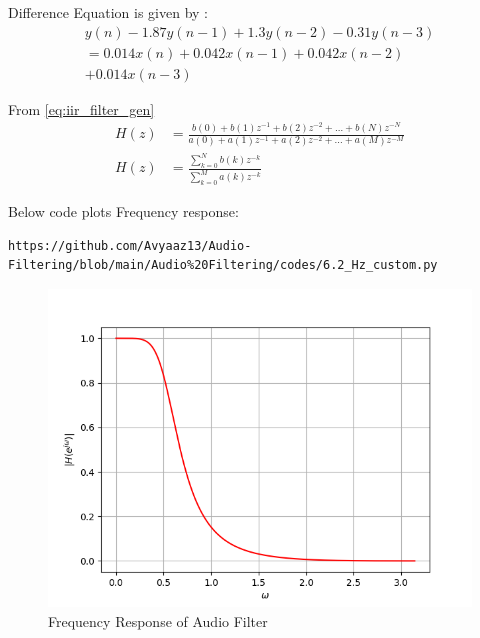\documentclass[journal,12pt,twocolumn]{IEEEtran}
\theoremstyle{remark}
\renewcommand\thesection{\arabic{section}}
\numberwithin{equation}{subsection}
\begin{document}
\begin{enumerate}[label=\thesection.\arabic*]
Difference Equation is given by :
\begin{multline}
      y(n) - 1.87 y(n - 1) + 1.3 y(n - 2) - 0.31 y(n - 3) \nonumber \\
	= 0.014 x(n) + 0.042 x(n - 1) + 0.042 x(n - 2) \\\nonumber
        + 0.014 x(n - 3) 
\end{multline}

From \eqref{eq:iir_filter_gen} 
\begin{align}
    H(z) &= \frac{b(0) + b(1) z^{-1} + b(2) z^{-2} + \ldots + b(N) z^{-N}}{a(0) + a(1) z^{-1} + a(2) z^{-2} + \ldots + a(M) z^{-M}}\\
    H(z) &= \frac{\sum_{k = 0}^{N}b(k)z^{-k}}{\sum_{k = 0}^{M}a(k)z^{-k}} \label{eq:trans-func}
\end{align}

Below code plots Frequency response:
\begin{lstlisting}
https://github.com/Avyaaz13/Audio-Filtering/blob/main/Audio%20Filtering/codes/6.2_Hz_custom.py
\end{lstlisting}
\begin{figure}[!ht]
\centering
\includegraphics[width=\columnwidth]{figs/Filter_Response.png}
\caption{Frequency Response of Audio Filter}
\label{fig:H(w)}
\end{figure}


\end{enumerate}
\end{document}
